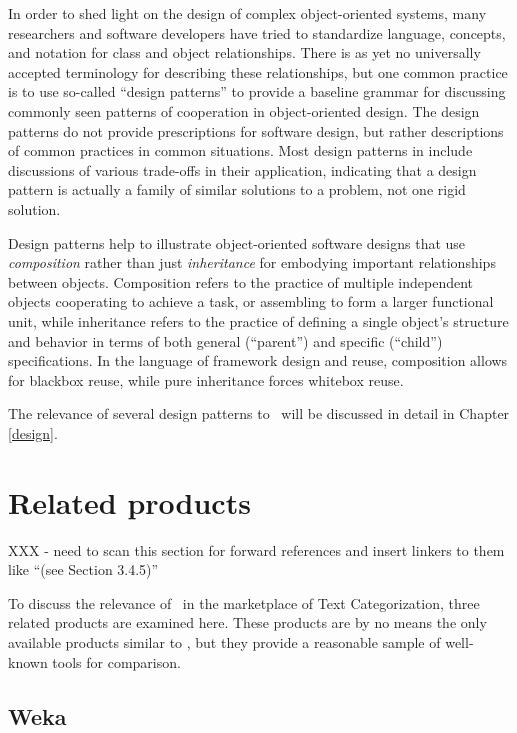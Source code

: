 In order to shed light on the design of complex object-oriented
systems, many researchers and software developers have tried to
standardize language, concepts, and notation for class and object
relationships.  There is as yet no universally accepted terminology
for describing these relationships, but one common practice is to use
so-called ``design patterns'' to provide a baseline grammar for
discussing commonly seen patterns of cooperation in object-oriented
design. \cite[p. 3]{gamma:95} The design patterns do not provide
prescriptions for software design, but rather descriptions of common
practices in common situations.  Most design patterns in
\cite{gamma:95} include discussions of various trade-offs in their
application, indicating that a design pattern is actually a family of
similar solutions to a problem, not one rigid solution.

Design patterns help to illustrate object-oriented software designs
that use \emph{composition} rather than just \emph{inheritance} for
embodying important relationships between objects.  Composition refers
to the practice of multiple independent objects cooperating to achieve
a task, or assembling to form a larger functional unit, while
inheritance refers to the practice of defining a single object's
structure and behavior in terms of both general (``parent'') and
specific (``child'') specifications.  In the language of framework
design and reuse, composition allows for blackbox reuse, while pure
inheritance forces whitebox reuse.\cite[p. 19]{gamma:95}

The relevance of several design patterns to \aicat\ will be discussed
in detail in Chapter \ref{design}.

\section{Related products}

XXX - need to scan this section for forward references and insert
linkers to them like ``(see Section 3.4.5)''

To discuss the relevance of \aicat\ in the marketplace of Text
Categorization, three related products are examined here.  These
products are by no means the only available products similar to
\aicat, but they provide a reasonable sample of well-known tools for
comparison.

\subsection{Weka}


